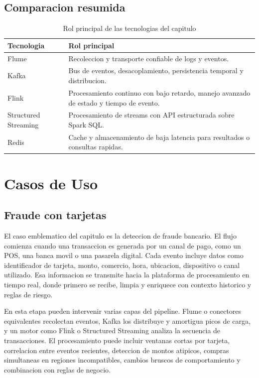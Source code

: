 \documentclass[12pt,a4paper]{article}
\begin{document}
\subsection{Comparacion resumida}

\begin{table}[h]
\centering
\caption{Rol principal de las tecnologias del capitulo}
\begin{tabularx}{\textwidth}{>{\RaggedRight\arraybackslash}p{2.5cm}X}
\toprule
\textbf{Tecnologia} & \textbf{Rol principal} \\
\midrule
Flume & Recoleccion y transporte confiable de logs y eventos. \\
Kafka & Bus de eventos, desacoplamiento, persistencia temporal y distribucion. \\
Flink & Procesamiento continuo con bajo retardo, manejo avanzado de estado y tiempo de evento. \\
Structured Streaming & Procesamiento de streams con API estructurada sobre Spark SQL. \\
Redis & Cache y almacenamiento de baja latencia para resultados o consultas rapidas. \\
\bottomrule
\end{tabularx}
\end{table}

\section{Casos de Uso}

\subsection{Fraude con tarjetas}

El caso emblematico del capitulo es la deteccion de fraude bancario. El flujo comienza cuando una transaccion es generada por un canal de pago, como un POS, una banca movil o una pasarela digital. Cada evento incluye datos como identificador de tarjeta, monto, comercio, hora, ubicacion, dispositivo o canal utilizado. Esa informacion se transmite hacia la plataforma de procesamiento en tiempo real, donde primero se recibe, limpia y enriquece con contexto historico y reglas de riesgo.

En esta etapa pueden intervenir varias capas del pipeline. Flume o conectores equivalentes recolectan eventos, Kafka los distribuye y amortigua picos de carga, y un motor como Flink o Structured Streaming analiza la secuencia de transacciones. El procesamiento puede incluir ventanas cortas por tarjeta, correlacion entre eventos recientes, deteccion de montos atipicos, compras simultaneas en regiones incompatibles, cambios bruscos de comportamiento y combinacion con reglas de negocio.
\end{document}
